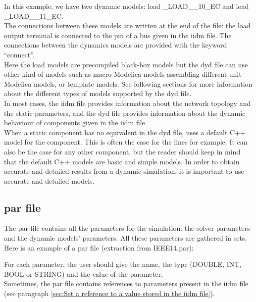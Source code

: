 \documentclass[a4paper, 12pt]{report}
\begin{document}
In this example, we have two dynamic models: load \_LOAD\_\_10\_EC and load \_LOAD\_\_11\_EC. \\

The connections between these models are written at the end of the file: the load output terminal is connected to the pin of a bus given in the iidm file. The connections between the dynamics models are provided with the keyword ``connect''. \\

Here the load models are precompiled black-box models but the dyd file can use other kind of models such as macro Modelica models assembling different unit Modelica models, or template models. See following sections for more information about the different types of models supported by the dyd file. \\

In most cases, the iidm file provides information about the network topology and the static parameters, and the dyd file provides information about the dynamic behaviour of components given in the iidm file. \\

When a static component has no equivalent in the dyd file, \Dynawo uses a default C++ model for the component. This is often the case for the lines for example. It can also be the case for any other component, but the reader should keep in mind that the default C++ models are basic and simple models. In order to obtain accurate and detailed results from a dynamic simulation, it is important to use accurate and detailed models.

\subsection{par file}

The par file contains all the parameters for the simulation: the solver parameters and the dynamic models' parameters. All these parameters are gathered in sets. \\

Here is an example of a par file (extraction from IEEE14.par):


For each parameter, the user should give the name, the type (DOUBLE, INT, BOOL or STRING) and the value of the parameter. \\

Sometimes, the par file contains references to parameters present in the iidm file (see paragraph \ref{sec:Set a reference to a value stored in the iidm file}).
\end{document}
